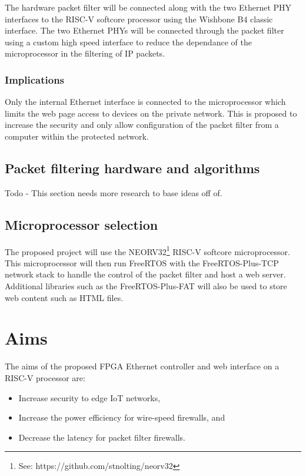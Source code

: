 \newpage

The hardware packet filter will be connected along with the two Ethernet PHY interfaces to the RISC-V softcore processor using the Wishbone B4 classic interface. 
The two Ethernet PHYs will be connected through the packet filter using a custom high speed interface to reduce the dependance of the microprocessor in the 
filtering of IP packets. 

\subsubsection{Implications}

Only the internal Ethernet interface is connected to the microprocessor which limits the web page access to devices on the private network. This is proposed to 
increase the security and only allow configuration of the packet filter from a computer within the protected network.

\subsection{Packet filtering hardware and algorithms}
Todo - This section needs more research to base ideas off of. 


\subsection{Microprocessor selection}
The proposed project will use the NEORV32\footnote[1]{See: https://github.com/stnolting/neorv32} RISC-V softcore microprocessor. This microprocessor will then 
run FreeRTOS with the FreeRTOS-Plus-TCP network stack to handle the control of the packet filter and host a web server. Additional libraries such as the 
FreeRTOS-Plus-FAT will also be used to store web content such as HTML files. 



\section{Aims}

The aims of the proposed FPGA Ethernet controller and web interface on a RISC-V processor are:

\begin{itemize}
    \item Increase security to edge IoT networks,
    \item Increase the power efficiency for wire-speed firewalls, and
    \item Decrease the latency for packet filter firewalls.
\end{itemize}



